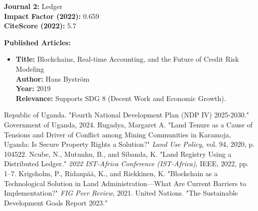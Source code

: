 \documentclass[11pt]{article}
\begin{document}
\noindent\textbf{Journal 2:} Ledger \\
\textbf{Impact Factor (2022):} 0.659 \\
\textbf{CiteScore (2022):} 5.7

\textbf{Published Articles:}
\begin{itemize}
    \item \textbf{Title:} Blockchains, Real-time Accounting, and the Future of Credit Risk Modeling \\
    \textbf{Author:} Hans Byström \\
    \textbf{Year:} 2019 \\
    \textbf{Relevance:} Supports SDG 8 (Decent Work and Economic Growth).
\end{itemize}

\newpage

\begin{thebibliography}{9}
 Republic of Uganda. "Fourth National Development Plan (NDP IV) 2025-2030." Government of Uganda, 2024.
 Rugadya, Margaret A. "Land Tenure as a Cause of Tensions and Driver of Conflict among Mining Communities in Karamoja, Uganda: Is Secure Property Rights a Solution?" \textit{Land Use Policy}, vol. 94, 2020, p. 104522.
 Ncube, N., Mutunhu, B., and Sibanda, K. "Land Registry Using a Distributed Ledger." \textit{2022 IST-Africa Conference (IST-Africa)}, IEEE, 2022, pp. 1–7.
 Krigsholm, P., Ridanpää, K., and Riekkinen, K. "Blockchain as a Technological Solution in Land Administration—What Are Current Barriers to Implementation?" \textit{FIG Peer Review}, 2021.
 United Nations. "The Sustainable Development Goals Report 2023."
\end{thebibliography}
\end{document}
